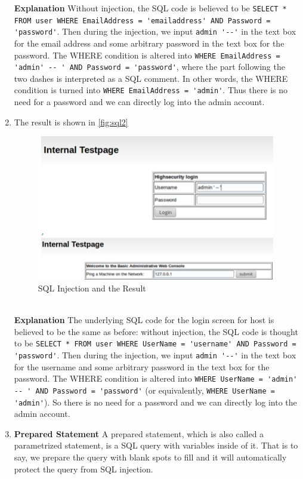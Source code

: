 \begin{enumerate}
  \textbf{Explanation} Without injection, the SQL code is believed to be \lstinline{SELECT * FROM user WHERE EmailAddress = 'emailaddress' AND Password = 'password'}. Then during the injection, we input \lstinline{admin '--'} in the text box for the email address and some arbitrary password in the text box for the password. The WHERE condition is altered into \lstinline{WHERE EmailAddress = 'admin' -- ' AND Password = 'password'}, where the part following the two dashes is interpreted as a SQL comment. In other words, the WHERE condition is turned into \lstinline{WHERE EmailAddress = 'admin'}. Thus there is no need for a password and we can directly log into the admin account.
\item The result is shown in \autoref{fig:sql2}
\begin{figure}[h!]
	\caption{SQL Injection and the Result}
        \label{fig:sql2}
	\centering \includegraphics[height=2.5in]{sqli2}
\end{figure}
\\
  \textbf{Explanation} The underlying SQL code for the login screen for host  is believed to be the same as before: without injection, the SQL code is thought to be \lstinline{SELECT * FROM user WHERE UserName = 'username' AND Password = 'password'}. Then during the injection, we input \lstinline{admin '--'} in the text box for the username and some arbitrary password in the text box for the password. The WHERE condition is altered into \lstinline{WHERE UserName = 'admin' -- ' AND Password = 'password'} (or equivalently, \lstinline{WHERE UserName = 'admin'}). So there is no need for a password and we can directly log into the admin account.
\item \textbf{Prepared Statement} 
  A prepared statement, which is also called a parametrized statement, is a SQL query with variables inside of it. That is to say, we prepare the query with blank spots to fill and it will automatically protect the query from SQL injection.


\end{enumerate}
